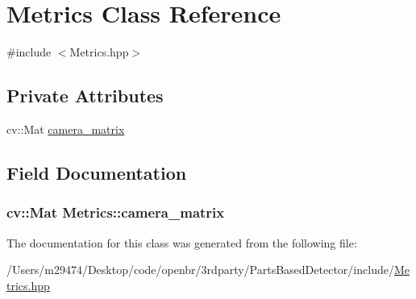 \hypertarget{class_metrics}{\section{Metrics Class Reference}
\label{class_metrics}
}


{\ttfamily \#include $<$Metrics.\-hpp$>$}

\subsection*{Private Attributes}
\begin{DoxyCompactItemize}
\item 
cv\-::\-Mat \hyperlink{class_metrics_aba72e7e31eb9057d1252e61cdf3aa904}{camera\-\_\-matrix}
\end{DoxyCompactItemize}


\subsection{Field Documentation}
\hypertarget{class_metrics_aba72e7e31eb9057d1252e61cdf3aa904}{
\subsubsection[{camera\-\_\-matrix}]{\setlength{\rightskip}{0pt plus 5cm}cv\-::\-Mat Metrics\-::camera\-\_\-matrix\hspace{0.3cm}{\ttfamily [private]}}}\label{class_metrics_aba72e7e31eb9057d1252e61cdf3aa904}


The documentation for this class was generated from the following file\-:\begin{DoxyCompactItemize}
\item 
/\-Users/m29474/\-Desktop/code/openbr/3rdparty/\-Parts\-Based\-Detector/include/\hyperlink{_metrics_8hpp}{Metrics.\-hpp}\end{DoxyCompactItemize}
